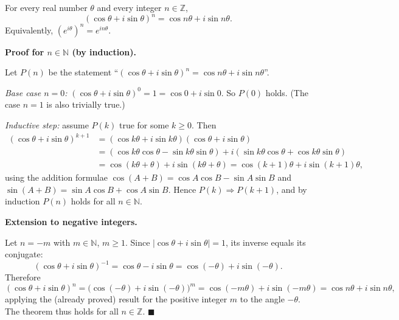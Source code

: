 \documentclass[11pt]{article}
\begin{document}
\begin{propriete}
For every real number $\theta$ and every integer $n \in \mathbb{Z}$,
\[ (\cos\theta + i\sin\theta)^n = \cos n\theta + i\sin n\theta. \]
Equivalently, $\left(e^{i\theta}\right)^n = e^{in\theta}$.
\end{propriete}

\textbf{Proof for $n \in \mathbb{N}$ (by induction).}\par
Let $P(n)$ be the statement ``$(\cos\theta + i\sin\theta)^n = \cos n\theta + i\sin n\theta$''.

\emph{Base case $n = 0$:} $(\cos\theta + i\sin\theta)^0 = 1 = \cos 0 + i\sin 0$. So $P(0)$ holds. (The case $n=1$ is also trivially true.)

\emph{Inductive step:} assume $P(k)$ true for some $k \geq 0$. Then
\begin{align*}
(\cos\theta + i\sin\theta)^{k+1} &= (\cos k\theta + i\sin k\theta)(\cos\theta + i\sin\theta)\\
&= (\cos k\theta\cos\theta - \sin k\theta\sin\theta) + i(\sin k\theta\cos\theta + \cos k\theta\sin\theta)\\
&= \cos(k\theta + \theta) + i\sin(k\theta + \theta) = \cos(k+1)\theta + i\sin(k+1)\theta,
\end{align*}
using the addition formulae $\cos(A+B)=\cos A\cos B-\sin A\sin B$ and $\sin(A+B)=\sin A\cos B+\cos A\sin B$. Hence $P(k) \Rightarrow P(k+1)$, and by induction $P(n)$ holds for all $n \in \mathbb{N}$.

\textbf{Extension to negative integers.}\par
Let $n = -m$ with $m \in \mathbb{N}$, $m \geq 1$. Since $|\cos\theta + i\sin\theta| = 1$, its inverse equals its conjugate:
\[ (\cos\theta + i\sin\theta)^{-1} = \cos\theta - i\sin\theta = \cos(-\theta) + i\sin(-\theta). \]
Therefore
\[ (\cos\theta + i\sin\theta)^{n} = \bigl(\cos(-\theta) + i\sin(-\theta)\bigr)^{m} = \cos(-m\theta) + i\sin(-m\theta) = \cos n\theta + i\sin n\theta, \]
applying the (already proved) result for the positive integer $m$ to the angle $-\theta$. The theorem thus holds for all $n \in \mathbb{Z}$. $\blacksquare$
\end{document}
